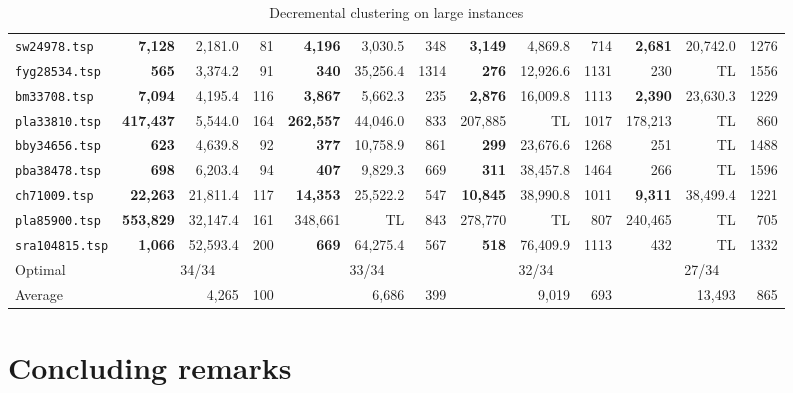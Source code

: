 \documentclass[ijoo,nonblindrev]{informs-ijoo}
\begin{document}
\begin{table}[!hbtp]
{\begin{tabular}{|l|rrr|rrr|rrr|rrr|}
			\texttt{sw24978.tsp} & \textbf{7,128} & 2,181.0 & 81 & \textbf{4,196} & 3,030.5 & 348 & \textbf{3,149} & 4,869.8 & 714 & \textbf{2,681} & 20,742.0 & 1276\\
			\texttt{fyg28534.tsp} & \textbf{565} & 3,374.2 & 91 & \textbf{340} & 35,256.4 & 1314 & \textbf{276} & 12,926.6 & 1131 & 230 & TL & 1556\\
			\texttt{bm33708.tsp} & \textbf{7,094} & 4,195.4 & 116 & \textbf{3,867} & 5,662.3 & 235 & \textbf{2,876} & 16,009.8 & 1113 & \textbf{2,390} & 23,630.3 & 1229\\
			\texttt{pla33810.tsp} & \textbf{417,437} & 5,544.0 & 164 & \textbf{262,557} & 44,046.0 & 833 & 207,885 & TL & 1017 & 178,213 & TL & 860\\
			\texttt{bby34656.tsp} & \textbf{623} & 4,639.8 & 92 & \textbf{377} & 10,758.9 & 861 & \textbf{299} & 23,676.6 & 1268 & 251 & TL & 1488\\
			\texttt{pba38478.tsp} & \textbf{698} & 6,203.4 & 94 & \textbf{407} & 9,829.3 & 669 & \textbf{311} & 38,457.8 & 1464 & 266 & TL & 1596\\
			\texttt{ch71009.tsp} & \textbf{22,263} & 21,811.4 & 117 & \textbf{14,353} & 25,522.2 & 547 & \textbf{10,845} & 38,990.8 & 1011 & \textbf{9,311} & 38,499.4 & 1221\\
			\texttt{pla85900.tsp} & \textbf{553,829} & 32,147.4 & 161 & 348,661 & TL & 843 & 278,770 & TL & 807 & 240,465 & TL & 705\\
			\texttt{sra104815.tsp} & \textbf{1,066} & 52,593.4 & 200 & \textbf{669} & 64,275.4 & 567 & \textbf{518} & 76,409.9 & 1113 & 432 & TL & 1332\\
			\hline
			Optimal & \multicolumn{3}{|c|}{34/34} & \multicolumn{3}{|c|}{33/34} & \multicolumn{3}{|c|}{32/34} & \multicolumn{3}{|c|}{27/34}\\
			Average & & 4,265 & 100 & & 6,686 & 399 & & 9,019 & 693 & & 13,493 & 865\\
			\hline
	\end{tabular}}
	\caption{Decremental clustering on large instances\label{table:large}}
\end{table}

\section{Concluding remarks\label{section:conclusions}}
\end{document}
